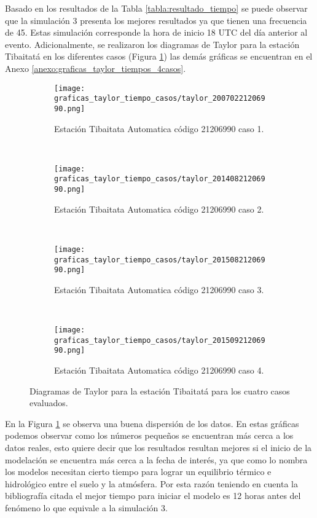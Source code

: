 Basado en los resultados de la Tabla \ref{tabla:resultado_tiempo} se puede observar que la simulación 3 presenta los mejores resultados ya que tienen una frecuencia de 45. Estas simulación corresponde la hora de inicio 18 UTC del día anterior al evento. Adicionalmente, se realizaron los diagramas de Taylor para la estación Tibaitatá en los diferentes casos (Figura \ref{fig:taylor_tiempo}) las demás gráficas se encuentran en el Anexo \ref{anexo:graficas_taylor_tiempos_4casos}.

\begin{figure}[H]
    \centering
    
\begin{subfigure}[normla]{0.4\textwidth}
\texttt{[image: graficas\_taylor\_tiempo\_casos/taylor\_20070221206990.png]}
\caption{Estación Tibaitata Automatica  código 21206990 caso 1.}
\end{subfigure}
~
\begin{subfigure}[normla]{0.4\textwidth}
\texttt{[image: graficas\_taylor\_tiempo\_casos/taylor\_20140821206990.png]}
\caption{Estación Tibaitata Automatica  código 21206990 caso 2.}
\end{subfigure}
~
\begin{subfigure}[normla]{0.4\textwidth}
\texttt{[image: graficas\_taylor\_tiempo\_casos/taylor\_20150821206990.png]}
\caption{Estación Tibaitata Automatica  código 21206990 caso 3.}
\end{subfigure}
~
\begin{subfigure}[normla]{0.4\textwidth}
\texttt{[image: graficas\_taylor\_tiempo\_casos/taylor\_20150921206990.png]}
\caption{Estación Tibaitata Automatica  código 21206990 caso 4.}
\end{subfigure}
    
    \caption{Diagramas de Taylor para la estación Tibaitatá para los cuatro casos evaluados.}
    \label{fig:taylor_tiempo}
\end{figure}

En la Figura \ref{fig:taylor_tiempo} se observa una buena dispersión de los datos. En estas gráficas podemos observar como los números pequeños se encuentran más cerca a los datos reales, esto quiere decir que los resultados resultan mejores si el inicio de la modelación se encuentra más cerca a la fecha de interés, ya que como lo nombra \citet{Kovacik2007} los modelos necesitan cierto tiempo para lograr un equilibrio térmico e hidrológico entre el suelo y la atmósfera. Por esta razón teniendo en cuenta la bibliografía citada el mejor tiempo para iniciar el modelo es 12 horas antes del fenómeno lo que equivale a la simulación 3.

